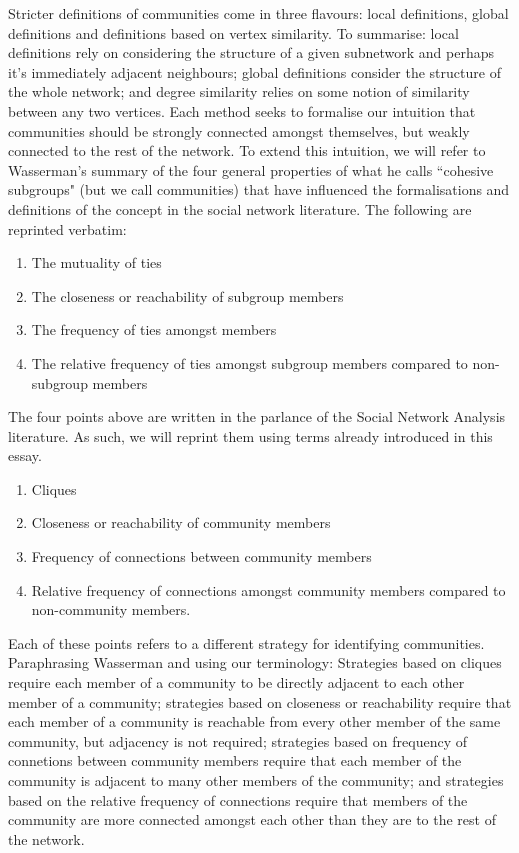Stricter definitions of communities come in three flavours: local definitions, global definitions and definitions based on vertex similarity. To summarise: local definitions rely on considering the structure of a given subnetwork and perhaps it's immediately adjacent neighbours; global definitions consider the structure of the whole network; and degree similarity relies on some notion of similarity between any two vertices. Each method seeks to formalise our intuition that communities should be strongly connected amongst themselves, but weakly connected to the rest of the network. To extend this intuition, we will refer to Wasserman's summary of the four general properties\cite[251-252]{wasserman_faust_1994} of what he calls ``cohesive subgroups" (but we call communities) that have influenced the formalisations and definitions of the concept in the social network literature. The following are reprinted verbatim:

\begin{enumerate}
    \item The mutuality of ties
    \item The closeness or reachability of subgroup members
    \item The frequency of ties amongst members
    \item The relative frequency of ties amongst subgroup members compared to non-subgroup members
\end{enumerate}

The four points above are written in the parlance of the Social Network Analysis literature. As such, we will reprint them using terms already introduced in this essay.

\begin{enumerate}
    \item Cliques
    \item Closeness or reachability of community members
    \item Frequency of connections between community members
    \item Relative frequency of connections amongst community members compared to non-community members.
\end{enumerate}

Each of these points refers to a different strategy for identifying communities. Paraphrasing Wasserman and using our terminology: Strategies based on cliques require each member of a community to be directly adjacent to each other member of a community; strategies based on closeness or reachability require that each member of a community is reachable from every other member of the same community, but adjacency is not required; strategies based on frequency of connetions between community members require that each member of the community is adjacent to many other members of the community; and strategies based on the relative frequency of connections require that members of the community are more connected amongst each other than they are to the rest of the network.


